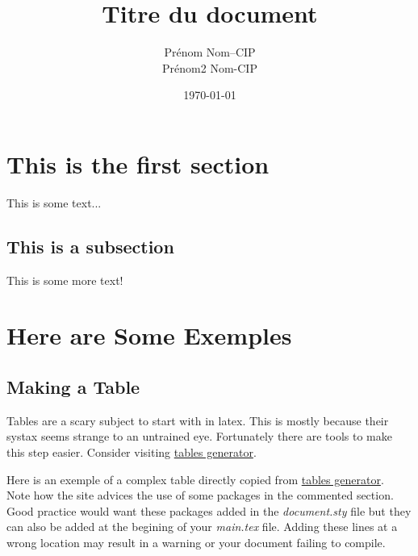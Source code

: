 \documentclass[a11paper, 11pt]{article}
\title{Titre du document}
\author{
  \addtolength{\tabcolsep}{-0.4em}
  \begin{tabular}{rcl} %
  Prénom Nom     & -- & CIP \\
  Prénom2 Nom    & - & CIP \\
  \end{tabular}
}
\date{\today}
\begin{document}
\maketitle
\newpage
\tableofcontents
\newpage

\section{This is the first section}
This is some text...

\subsection{This is a subsection}
This is some more text!


\section{Here are Some Exemples}

\subsection{Making a Table}

Tables are a scary subject to start with in latex.
This is mostly because their systax seems strange to an untrained eye.
Fortunately there are tools to make this step easier.
Consider visiting \href{https://www.tablesgenerator.com/} {tables generator}.


Here is an exemple of a complex table directly copied from \href{https://www.tablesgenerator.com/} {tables generator}.
\\
Note how the site advices the use of some packages in the commented section.
Good practice would want these packages added in the \textit{document.sty} file but they can also be added at the begining
of your \textit{main.tex} file. Adding these lines at a wrong location may result in a warning or your
document failing to compile.
\end{document}
